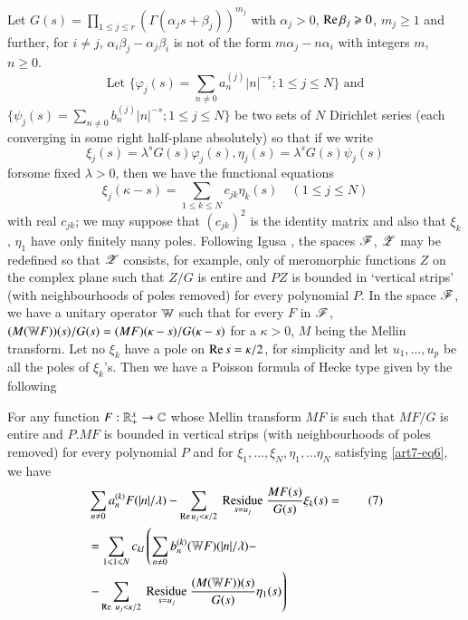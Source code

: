 Let $G (s) = \prod\limits_{1 \leqslant j \leqslant r} (\Gamma (\alpha_j s + \beta_j))^{m_j}$ with $\alpha_j > 0$, $\operatorname{Re} \beta_j \geqslant 0$, $m_j \geqslant 1$ and further, for $i \neq j$, $\alpha_i \beta_j - \alpha_j \beta_i$ is not of the form $m \alpha_j - n \alpha_i$ with integers $m$, $n \geqslant 0$.
$$
\text{Let } \{\varphi_j (s) =\sum\limits_{n \neq 0}  a^{(j)}_n |n|^{-s}; 1 \leqslant j \leqslant N \} \text{ and}
$$
$\{\psi_j (s) = \sum\limits_{n \neq 0} b^{(j)}_n |n|^{-s}; 1 \leqslant j \leqslant N\}$ be two sets of $N$ Dirichlet series (each converging in some right half-plane absolutely) so that if we write 
\begin{equation*}
\xi_j (s) = \lambda^s G (s) \varphi_j (s), \eta_j (s) = \lambda^s G(s) \psi_j (s) \tag*{$(1\leqslant j \leqslant N)$}
\end{equation*}
for\pageoriginale some fixed $\lambda > 0$, then we have the functional equations 
\begin{equation*}
\xi_j (\kappa - s) = \sum\limits_{1 \leqslant k \leqslant N} c_{jk} \eta_k (s) \quad (1 \leqslant j \leqslant N)\tag{6} \label{art7-eq6}
\end{equation*}
with real $c_{jk}$; we may suppose that $(c_{jk})^2$ is the identity matrix and also that $\xi_k$, $\eta_1$ have only finitely many poles. Following Igusa \cite{art7-I}, the spaces $\mathscr{F}$, $\mathscr{Z}$ may be redefined so that $\mathscr{Z}$ consists, for example, only of meromorphic functions $Z$ on the complex plane such that $Z/G$ is entire and $PZ$ is bounded in `vertical strips' (with neighbourhoods of poles removed) for every polynomial $P$. In the space $\mathscr{F}$, we have a unitary operator $\mathbb{W}$ such that for every $F$ in $\mathscr{F}$, $(M (\mathbb{W} F)) (s)/ G (s) = (MF) (\kappa -s)/ G (\kappa -s)$ for a $\kappa > 0$, $M$ being the Mellin transform. Let no $\xi_k$ have a pole on $\operatorname{Re} s = \kappa /2$, for simplicity and let $u_1,\ldots, u_p$ be all the poles of $\xi_k$'s. Then we have a Poisson formula of Hecke type \cite{art7-R-R} given by the following

\begin{theorem*}
For any function $F: \mathbb{R}^x_+ \to \mathbb{C}$ whose Mellin transform $MF$ is such that $MF/G$ is entire and $P.MF$ is bounded in vertical strips (with neighbourhoods of poles removed) for every polynomial $P$ and for $\xi_1, \ldots, \xi_N, \eta_1, \ldots \eta_N$ satisfying \eqref{art7-eq6}, we have 
\begin{align*}
&\sum\limits_{n \neq 0} a^{(k)}_n F (|n|/\lambda) - \sum\limits_{\operatorname{Re} u_j < \kappa /2} {\displaystyle\mathop{\text{ Residue }}_{s = u_j}}\frac{MF (s)}{G(s)} \xi_k(s) = \tag{7}\label{art7-eq7}\\
&= \sum\limits_{1 \leqslant 1 \leqslant N} c_{kl} \left(\sum\limits_{n\neq 0} b^{(k)}_n (\mathbb{W} F) (|n|/\lambda) - \right. \notag\\
& \left. - \sum\limits_{\operatorname{Re} \; u_j < \kappa /2}  {\displaystyle\mathop{\text{ Residue }}_{s = u_j}} \frac{(M (\mathbb{W} F)) (s)}{G (s)} \eta_1 (s) \right)
\end{align*}
\end{theorem*}

